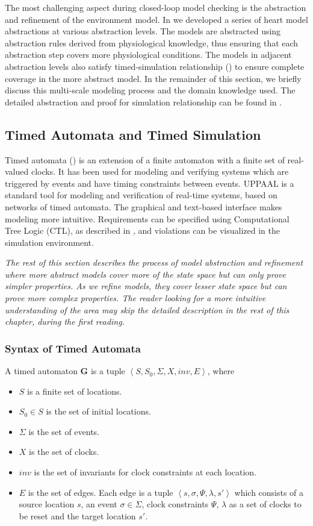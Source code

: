 The most challenging aspect during closed-loop model checking is the abstraction and refinement of the environment model. In \cite{STTT13} we developed a series of heart model abstractions at various abstraction levels. The models are abstracted using abstraction rules derived from physiological knowledge, thus ensuring that each abstraction step covers more physiological conditions. The models in adjacent abstraction levels also satisfy \textsf{timed-simulation} relationship (\cite{simulation}) to ensure complete coverage in the more abstract model. In the remainder of this section, we briefly discuss this multi-scale modeling process and the domain knowledge used. The detailed abstraction and proof for simulation relationship can be found in \cite{STTT13}.

\subsection{Timed Automata and Timed Simulation}
Timed automata (\cite{timed_automata}) is an extension of a finite automaton with a finite set of real-valued clocks. It has been used for modeling and verifying systems which are triggered by events and have timing constraints between events.  UPPAAL is a standard tool for modeling and verification of real-time systems, based on networks of timed automata. The graphical and text-based interface makes modeling more intuitive. Requirements can be specified using Computational Tree Logic (CTL), as described in \cite{Clarke}, and violations can be visualized in the simulation environment.

\emph{The rest of this section describes the process of model abstraction and refinement where more abstract models cover more of the state space but can only prove simpler properties. As we refine models, they cover lesser state space but can prove more complex properties. The reader looking for a more intuitive understanding of the area may skip the detailed description in the rest of this chapter, during the first reading.}

\subsubsection{Syntax of Timed Automata}
A timed automaton \textbf{G} is a tuple $\left\langle S,S_0,\Sigma,X,inv,E\right\rangle$, where

\begin{itemize}
	\item $S$ is a finite set of locations.
	\item $S_0\in S$ is the set of initial locations.
	\item $\Sigma$ is the set of events.
	\item $X$ is the set of clocks.
	\item $inv$ is the set of invariants for clock constraints at each location.
	\item $E$ is the set of edges. Each edge is a tuple $\left\langle s,\sigma,\Psi,\lambda,s'\right\rangle$ which consists of a source location $s$, an event $\sigma\in\Sigma$, clock constraints $\Psi$, $\lambda$ as a set of clocks to be reset and the target location $s'$.   
\end{itemize}

